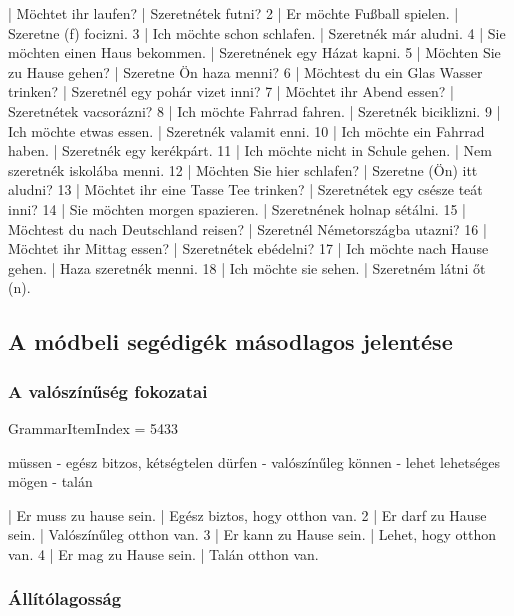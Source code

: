 \documentclass{article}
\newenvironment{desc}{\verbatim}{\endverbatim}
\newenvironment{exmp}{\verbatim}{\endverbatim}
\begin{document}
\begin{exmp}
1 | Möchtet ihr laufen? | Szeretnétek futni?
2 | Er möchte Fußball spielen. | Szeretne (f) focizni.
3 | Ich möchte schon schlafen. | Szeretnék már aludni.
4 | Sie möchten einen Haus bekommen. | Szeretnének egy Házat kapni.
5 | Möchten Sie zu Hause gehen? | Szeretne Ön haza menni?
6 | Möchtest du ein Glas Wasser trinken? | Szeretnél egy pohár vizet inni?
7 | Möchtet ihr Abend essen? | Szeretnétek vacsorázni?
8 | Ich möchte Fahrrad fahren. | Szeretnék biciklizni.
9 | Ich möchte etwas essen. | Szeretnék valamit enni.
10 | Ich möchte ein Fahrrad haben. | Szeretnék egy kerékpárt.
11 | Ich möchte nicht in Schule gehen. | Nem szeretnék iskolába menni.
12 | Möchten Sie hier schlafen? | Szeretne (Ön) itt aludni?
13 | Möchtet ihr eine Tasse Tee trinken? | Szeretnétek egy csésze teát inni?
14 | Sie möchten morgen spazieren. | Szeretnének holnap sétálni.
15 | Möchtest du nach Deutschland reisen? | Szeretnél Németországba utazni?
16 | Möchtet ihr Mittag essen? | Szeretnétek ebédelni?
17 | Ich möchte nach Hause gehen. | Haza szeretnék menni.
18 | Ich möchte sie sehen. | Szeretném látni őt (n).
\end{exmp}

\subsection{A módbeli segédigék másodlagos jelentése}

\subsubsection{A valószínűség fokozatai}

GrammarItemIndex = 5433

\begin{desc}
\begin{enumerate}
müssen - egész bitzos, kétségtelen
dürfen - valószínűleg
können - lehet lehetséges
mögen - talán
\end{enumerate}
\end{desc}

\begin{exmp}
1 | Er muss zu hause sein. | Egész biztos, hogy otthon van.
2 | Er darf zu Hause sein. | Valószínűleg otthon van.
3 | Er kann zu Hause sein. | Lehet, hogy otthon van.
4 | Er mag zu Hause sein. | Talán otthon van.
\end{exmp}

\subsubsection{Állítólagosság}
\end{document}
